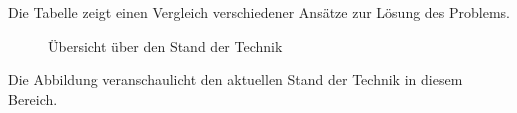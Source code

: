 Die Tabelle zeigt einen Vergleich verschiedener Ansätze zur Lösung des Problems.

\begin{figure}[htbp]
    \centering
    \caption{Übersicht über den Stand der Technik}
    \label{fig:stand-der-technik}
\end{figure}

Die Abbildung veranschaulicht den aktuellen Stand der Technik in diesem Bereich.

